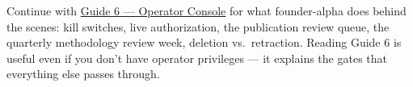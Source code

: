 \documentclass[11pt]{article}
\begin{document}
\begin{nextup}
Continue with \href{06_Operator_Console.pdf}{Guide 6 --- Operator
Console} for what founder-alpha does behind the scenes: kill
switches, live authorization, the publication review queue, the
quarterly methodology review week, deletion vs.\ retraction. Reading
Guide 6 is useful even if you don't have operator privileges --- it
explains the gates that everything else passes through.
\end{nextup}
\end{document}
